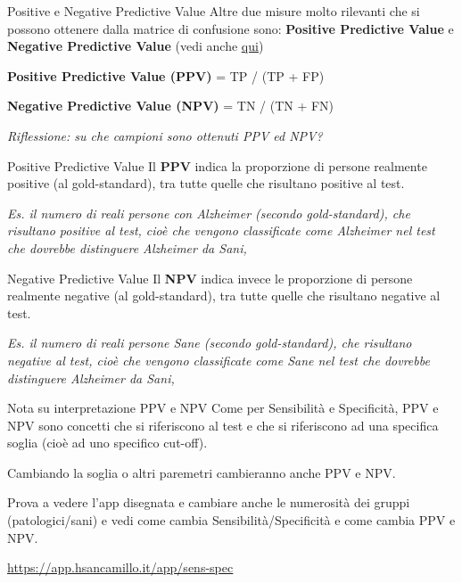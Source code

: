\documentclass[
  ignorenonframetext,
  aspectratio=169,
]{beamer}
\begin{document}
\begin{frame}{Positive e Negative Predictive Value}
\label{positive-e-negative-predictive-value}
Altre due misure molto rilevanti che si possono ottenere dalla matrice
di confusione sono: \textbf{Positive Predictive Value} e
\textbf{Negative Predictive Value} (vedi anche
\href{https://epidemiology.sruc.ac.uk/shiny/apps/predictive_values/}{\underline{qui}})
\vfill

\textbf{Positive Predictive Value (PPV)} = TP / (TP + FP)

\textbf{Negative Predictive Value (NPV)} = TN / (TN + FN) \pause

\emph{Riflessione: su che campioni sono ottenuti PPV ed NPV?}
\end{frame}

\begin{frame}{Positive Predictive Value}
\label{positive-predictive-value}
Il \textbf{PPV} indica la proporzione di persone realmente positive (al
gold-standard), tra tutte quelle che risultano positive al test.

\emph{Es. il numero di reali persone con Alzheimer (secondo
gold-standard), che risultano positive al test, cioè che vengono
classificate come Alzheimer nel test che dovrebbe distinguere Alzheimer
da Sani,}
\end{frame}

\begin{frame}{Negative Predictive Value}
\label{negative-predictive-value}
Il \textbf{NPV} indica invece le proporzione di persone realmente
negative (al gold-standard), tra tutte quelle che risultano negative al
test.

\emph{Es. il numero di reali persone Sane (secondo gold-standard), che
risultano negative al test, cioè che vengono classificate come Sane nel
test che dovrebbe distinguere Alzheimer da Sani,}
\end{frame}

\begin{frame}{Nota su interpretazione PPV e NPV}
\label{nota-su-interpretazione-ppv-e-npv}
Come per Sensibilità e Specificità, PPV e NPV sono concetti che si
riferiscono al test e che si riferiscono ad una specifica soglia (cioè
ad uno specifico cut-off).

Cambiando la soglia o altri paremetri cambieranno anche PPV e NPV.

Prova a vedere l'app disegnata e cambiare anche le numerosità dei gruppi
(patologici/sani) e vedi come cambia Sensibilità/Specificità e come
cambia PPV e NPV.

\begin{center}
\underline{\url{https://app.hsancamillo.it/app/sens-spec}}
\end{center}
\end{frame}
\end{document}

